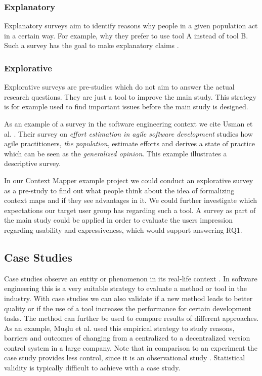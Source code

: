 \documentclass[runningheads]{llncs}
\begin{document}
\subsubsection{Explanatory}
Explanatory surveys aim to identify reasons why people in a given population act in a certain way. For example, why they prefer to use tool A instead of tool B. Such a survey has the goal to make explanatory claims \cite{Wohlin:2012:ESE:2349018}.

\subsubsection{Explorative}
Explorative surveys are pre-studies \cite{Wohlin:2012:ESE:2349018} which do not aim to answer the actual research questions. They are just a tool to improve the main study. This strategy is for example used to find important issues before the main study is designed.

\bigskip
\noindent
As an example of a survey in the software engineering context we cite Usman et al. \cite{Usman:2015:EEA:2745802.2745813}. Their survey on \textit{effort estimation in agile software development} studies how agile practitioners, \textit{the population}, estimate efforts and derives a state of practice which can be seen as the \textit{generalized opinion}. This example illustrates a descriptive survey. 

In our Context Mapper example project we could conduct an explorative survey as a pre-study to find out what people think about the idea of formalizing context maps and if they see advantages in it. We could further investigate which expectations our target user group has regarding such a tool. A survey as part of the main study could be applied in order to evaluate the users impression regarding usability and expressiveness, which would support answering RQ1.

\subsection{Case Studies}
Case studies observe an entity or phenomenon in its real-life context \cite{Wohlin:2012:ESE:2349018}. In software engineering this is a very suitable strategy to evaluate a method or tool in the industry. With case studies we can also validate if a new method leads to better quality or if the use of a tool increases the performance for certain development tasks. The method can further be used to compare results of different approaches. As an example, Mu\c{s}lu et al. \cite{Muslu:2014:TCD:2568225.2568284} used this empirical strategy to study reasons, barriers and outcomes of changing from a centralized to a decentralized version control system in a large company. Note that in comparison to an experiment the case study provides less control, since it is an observational study \cite{675630}. Statistical validity is typically difficult to achieve with a case study.
\end{document}
